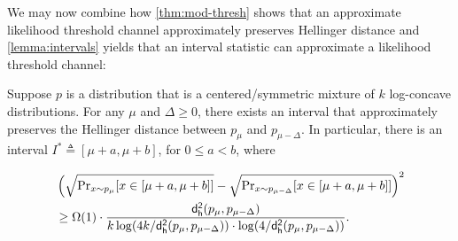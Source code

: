 We may now combine how \cref{thm:mod-thresh} shows that an approximate likelihood threshold channel approximately preserves Hellinger distance and \cref{lemma:intervals} yields that an interval statistic can approximate a likelihood threshold channel:

\begin{corollary}\label{cor:hk-to-int}
    Suppose $p$ is a distribution that is a centered/symmetric mixture of $k$ log-concave distributions. For any $\mu$ and $\Delta \ge 0$, there exists an interval that approximately preserves the Hellinger distance between $p_{\mu}$ and $p_{\mu-\Delta}$. In particular, there is an interval $I^* \triangleq [\mu+a,\mu+b]$, for $0 \le a < b$, where

    \begin{align*}
        & \left( \sqrt{\operatorname{{Pr}}_{x \sim p_{\mu}}[x \in [\mu+a,\mu+b]]} -  \sqrt{\operatorname{{Pr}}_{x \sim p_{\mu-\Delta}}[x \in [\mu+a,\mu+b]]} \right)^2 \\
        & \ge \Omega(1) \cdot \frac{\mathsf{d_{h}^2}(p_{\mu},p_{\mu-\Delta})}{k \log(4k/\mathsf{d_{h}^2}(p_{\mu},p_{\mu-\Delta})) \cdot \log(4/\mathsf{d_{h}^2}(p_{\mu},p_{\mu-\Delta}))}.
    \end{align*}
\end{corollary}
